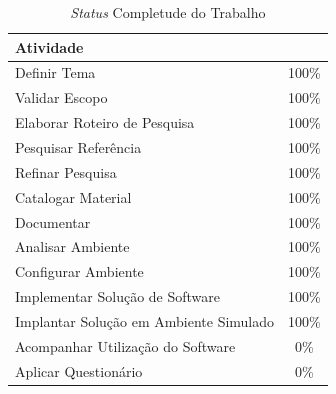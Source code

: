  
\begin{table}[h!]
\centering
\caption{\textit{Status} Completude do Trabalho}
\label{table_status}
\begin{tabular}{lc}
\rowcolor[HTML]{9A0000} 
{\color[HTML]{FFFFFF} \textbf{Atividade}} & \multicolumn{1}{l}{\cellcolor[HTML]{9A0000}{\color[HTML]{FFFFFF} \textbf{Status}}} \\ \hline
Definir Tema                              & 100\%                                                                              \\ \hline
Validar Escopo                            & 100\%                                                                              \\ \hline
Elaborar Roteiro de Pesquisa              & 100\%                                                                              \\ \hline
Pesquisar Referência                      & 100\%                                                                              \\ \hline
Refinar Pesquisa                          & 100\%                                                                              \\ \hline
Catalogar Material                        & 100\%                                                                              \\ \hline
Documentar                                & 100\%                                                                               \\ \hline
Analisar Ambiente                         & 100\%                                                                               \\ \hline
Configurar Ambiente                       & 100\%                                                                                \\ \hline
Implementar Solução de Software           & 100\%                                                                                \\ \hline
Implantar Solução em Ambiente Simulado    & 100\%                                                                                \\ \hline
Acompanhar Utilização do Software         & 0\%                                                                                \\ \hline
Aplicar Questionário                      & 0\%                                                                                \\ \hline
\end{tabular}
\end{table}
